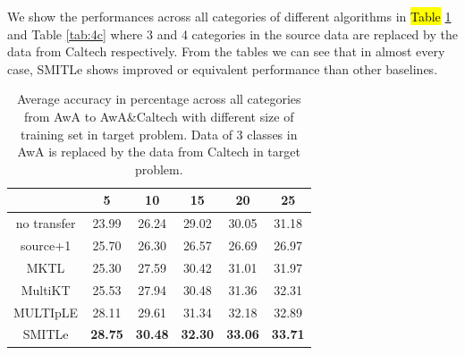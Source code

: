 We show the performances across all categories of different algorithms in \hl{Table} \ref{tab:3c} and Table \ref{tab:4c} where 3 and 4 categories in the source data are replaced by the data from Caltech respectively. From the tables we can see that in almost every case, SMITLe shows improved or equivalent performance than other baselines. %

\begin{table}[htbp]
  \centering
  \caption{Average accuracy in percentage across all categories from AwA to AwA\&Caltech with different size of training set in target problem. Data of 3 classes in AwA is replaced by the data from Caltech in target problem.}
    \begin{tabular}{cccccc}
    \toprule
          & 5     & 10    & 15    & 20    & 25 \\
    \midrule
    no transfer &         23.99  &         26.24  &         29.02  &         30.05  &         31.18  \\
    source+1 &         25.70  &         26.30  &         26.57  &         26.69  &         26.97  \\
    MKTL  &         25.30  &         27.59  &         30.42  &         31.01  &         31.97  \\
    MultiKT &         25.53  &         27.94  &         30.48  &         31.36  &         32.31  \\
    MULTIpLE &         28.11  &         29.61  &         31.34  &         32.18  &         32.89  \\
    SMITLe &         \textbf{28.75}  &         \textbf{30.48}  &         \textbf{32.30}  &         \textbf{33.06}  &         \textbf{33.71}  \\
    \bottomrule
    \end{tabular}%
  \label{tab:3c}%
\end{table}%



